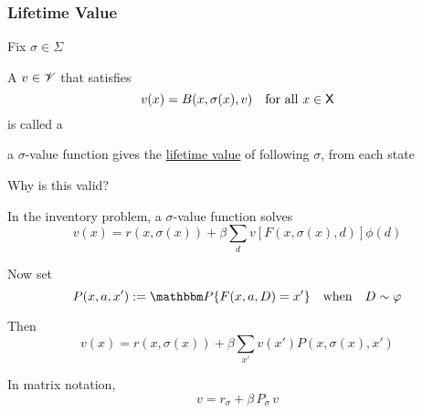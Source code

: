 \begin{frame}
    \frametitle{Lifetime Value}

    Fix $\sigma \in \Sigma$ 

              \vspace{0.5em}
              \vspace{0.5em}
    A $v \in \mathscr V$ that satisfies
    \begin{equation*}
        v(x) = B(x, \sigma(x), v)
        \quad \text{for all } x \in \mathsf X
    \end{equation*}
    is called a 

              \vspace{0.5em}
     a $\sigma$-value function gives the \underline{lifetime
    value} of following $\sigma$, from each state

              \vspace{0.5em}
              \vspace{0.5em}

    Why is this valid?

\end{frame}

\begin{frame}
    
    \Eg In the inventory problem, a $\sigma$-value function solves 
    \begin{equation*}
        v(x)
        = r(x, \sigma(x))
                + \beta
                \sum_d v [F(x, \sigma(x), d) ] \phi(d)
    \end{equation*}

              \vspace{0.5em}
    Now set 
    \begin{equation*}
        P(x, a, x') := \PP\{ F(x,a,D) = x' \}
        \quad \text{when} \quad
        D \sim \phi
    \end{equation*}

    Then
    \begin{equation*}
        v(x)
        = r(x, \sigma(x))
                + \beta
                \sum_{x'} v (x') P(x, \sigma(x), x') 
    \end{equation*}

              \vspace{0.5em}
    In matrix notation,
    \begin{equation*}
        v = r_\sigma + \beta \, P_\sigma \, v
    \end{equation*}

\end{frame}

